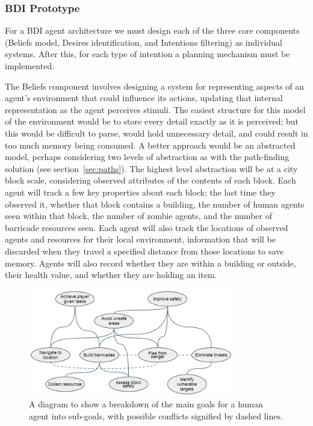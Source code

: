 \documentclass[12pt,a4paper]{article}
\begin{document}
\subsubsection{BDI Prototype}\noindent
For a BDI agent architecture we must design each of the three core components (Beliefs model, Desires identification, and Intentions filtering) as individual systems. After this, for each type of intention a planning mechanism must be implemented.

The Beliefs component involves designing a system for representing aspects of an agent's environment that could influence its actions, updating that internal representation as the agent perceives stimuli. The easiest structure for this model of the environment would be to store every detail exactly as it is perceived; but this would be difficult to parse, would hold unnecessary detail, and could result in too much memory being consumed. A better approach would be an abstracted model, perhaps considering two levels of abstraction as with the path-finding solution (see section~\ref{sec:paths}). The highest level abstraction will be at a city block scale, considering observed attributes of the contents of each block. Each agent will track a few key properties about each block; the last time they observed it, whether that block contains a building, the number of human agents seen within that block, the number of zombie agents, and the number of barricade resources seen. Each agent will also track the locations of observed agents and resources for their local environment, information that will be discarded when they travel a specified distance from those locations to save memory. Agents will also record whether they are within a building or outside, their health value, and whether they are holding an item.

\begin{figure}[h]
\centering
\includegraphics[width=0.8\textwidth]{goals}
\caption{A diagram to show a breakdown of the main goals for a human agent into sub-goals, with possible conflicts signified by dashed lines.}
\label{fig:goals}
\end{figure}
\end{document}
